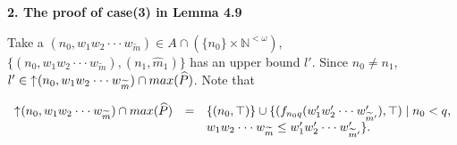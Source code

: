 \documentclass[preprint,12pt]{elsarticle}
\numberwithin{equation}{section}
\newcommand{\dn}{\mathord{\downarrow}\hspace{0.05em}}
\newcommand{\up}{\mathord{\uparrow}\hspace{0.05em}}
\begin{document}





{\bf 2. The proof of case(3) in Lemma 4.9}






Take a $(n_{0},w_{1}w_{2}\cdot\cdot\cdot w_{\widetilde{m}})\in A\cap (\{n_{0}\}\times \mathbb{N}^{<\omega})$, $\{(n_{0},w_{1}w_{2}\cdot\cdot\cdot w_{\widetilde{m}}),(n_{1},\hat{m}_{1})\}$ has an upper bound $l'$. Since $n_{0}\neq n_{1}$, $l'\in\up(n_{0},w_{1}w_{2}\cdot\cdot\cdot w_{\widetilde{m}})\cap max(\widehat{P})$. Note that

\begin{center}$\begin{array}{lll}
\up(n_{0},w_{1}w_{2}\cdot\cdot\cdot w_{\widetilde{m}})\cap max(\widehat{P})&=&\{(n_{0},\top)\}\cup\{(f_{n_{0}q}(w'_{1}w'_{2}\cdot\cdot\cdot w'_{\widetilde{m}'}),\top)\mid n_{0}<q,\\
&&  w_{1}w_{2}\cdot\cdot\cdot w_{\widetilde{m}}\leq w'_{1}w'_{2}\cdot\cdot\cdot w'_{\widetilde{m}'}\}.\\
\end{array}$\end{center}
\end{document}
